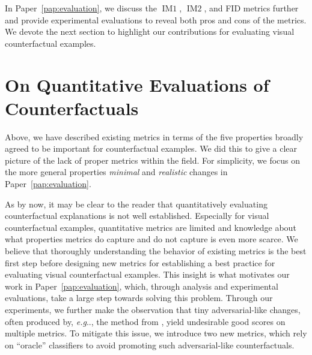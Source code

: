 \documentclass[11pt,a4paper,twoside,openright,final]{memoir}
\makeatletter
\DeclareRobustCommand\onedot{\futurelet\@let@token\@onedot}
\def\@onedot{\ifx\@let@token.\else.\null\fi\xspace}
\def\eg{\emph{e.g}\onedot} \def\Eg{\emph{E.g}\onedot}
\newcommand\contribution[1]{\hspace{0.5em}\hyperref[#1]{\ding{81}}}
\newcommand*{\paperref}[1]{Paper~\hyperref[#1]{\ref{#1}}}
\makeatother
\begin{document}
In \paperref{pap:evaluation}, we discuss the $\operatorname{IM1}$, $\operatorname{IM2}$, and FID metrics further and provide experimental evaluations to reveal both pros and cons of the metrics.
We devote the next section to highlight our contributions for evaluating visual counterfactual examples. 

\section{On Quantitative Evaluations of Counterfactuals\contribution{pap:evaluation}}\label{sec:evaluation-paper}

Above, we have described existing metrics in terms of the five properties broadly agreed to be important for counterfactual examples.
We did this to give a clear picture of the lack of proper metrics within the field. 
For simplicity, we focus on the more general properties \emph{minimal} and \emph{realistic} changes in \paperref{pap:evaluation}. 

As by now, it may be clear to the reader that quantitatively evaluating counterfactual explanations is not well established.
Especially for visual counterfactual examples, quantitative metrics are limited and knowledge about what properties metrics do capture and do not capture is even more scarce.
We believe that thoroughly understanding the behavior of existing metrics is the best first step before designing new metrics for establishing a best practice for evaluating visual counterfactual examples.
This insight is what motivates our work in \paperref{pap:evaluation}, which, through analysis and experimental evaluations, take a large step towards solving this problem.
Through our experiments, we further make the observation that tiny adversarial-like changes, often produced by, \eg, the method from \cite{Wachter2017}, yield undesirable good scores on multiple metrics.
To mitigate this issue, we introduce two new metrics, which rely on ``oracle'' classifiers to avoid promoting such adversarial-like counterfactuals.
\end{document}
